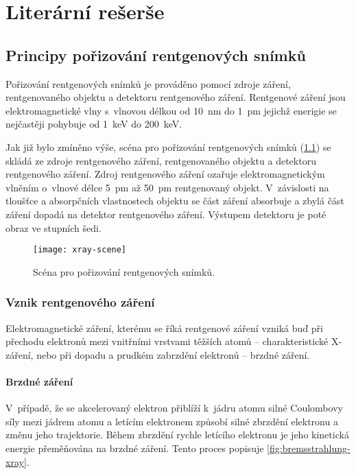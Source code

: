 \chapter{Literární rešerše}

\section{Principy pořizování rentgenových snímků}
\label{sec:principy}
Pořizování rentgenových snímků je prováděno pomocí zdroje záření, rentgenovaného objektu a detektoru rentgenového záření. Rentgenové záření jsou elektromagnetické vlny s~vlnovou délkou od \SI{10}{\nano\meter} do \SI{1}{\pico\meter} jejichž enerigie se nejčastěji pohybuje od \SI{1}{\kilo\eV} do \SI{200}{\kilo\eV}. \cite{AstroNuklFyzika-JadRadFyzika}

Jak již bylo zmíněno výše, scéna pro pořizování rentgenových snímků (\cref{fig:xray-scene}) se skládá ze zdroje rentgenového záření, rentgenovaného objektu a detektoru rentgenového záření. Zdroj rentgenového záření ozařuje elektromagnetickým vlněním o~vlnové délce \SI{5}{\pico\meter} až \SI{50}{\pico\meter} rentgenovaný objekt. V~závislosti na tloušťce a absorpčních vlastnostech objektu se část záření absorbuje a zbylá část záření dopadá na detektor rentgenového záření. Výstupem detektoru je poté obraz ve stupních šedi. \cite[kap.~3.2]{AstroNuklFyzika-JadRadMetody}

\begin{figure}[bh]
\texttt{[image: xray-scene]}
\caption{Scéna pro pořizování rentgenových snímků.}
\label{fig:xray-scene}
\centering
\end{figure}

\subsection{Vznik rentgenového záření}
\label{sec:vznik-rentgenoveho-zareni}
Elektromagnetické záření, kterému se říká rentgenové záření vzniká buď při přechodu elektronů mezi vnitřními vrstvami těžších atomů -- charakteristické X-záření, nebo při dopadu a prudkém zabrzdění elektronů -- brzdné záření. \cite{AstroNuklFyzika-JadRadFyzika}

\subsubsection{Brzdné záření}
V~případě, že se akcelerovaný elektron přiblíží k~jádru atomu silné Coulombovy síly mezi jádrem atomu a letícím elektronem způsobí silné zbrzdění elektronu a změnu jeho trajektorie. Během zbrzdění rychle letícího elektronu  je jeho kinetická energie přeměňována na brzdné záření. \cite[str.~89]{Diagnostic-Radiology-Physics} Tento proces popisuje \cref{fig:bremsstrahlung-xray}.

